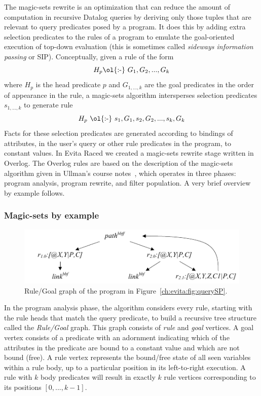 {The magic-sets rewrite is an optimization that can reduce the amount of
computation in recursive Datalog queries by deriving only those tuples that are
relevant to query predicates posed by a program.  It does this by adding extra
selection predicates to the rules of a program to emulate the goal-oriented
execution of top-down evaluation (this is sometimes called \emph{sideways
information passing} or SIP).  Conceptually, given a rule of the form 
\[ H_p \text{\ol{:-}}\ G_1, G_2, ..., G_k \] where $H_p$ is the head predicate $p$ and
$G_{1,...,k}$ are the goal predicates in the order of appearance in the rule, a
magic-sets algorithm intersperses selection predicates $s_{1,...,k}$ to
generate rule \[ H_p \ \text{\ol{:-}}\ s_1, G_1, s_2, G_2, ..., s_{k}, G_k \]
Facts for these selection predicates are generated according to bindings of
attributes, in the user's query or other rule predicates in the program, to
constant values.  In Evita Raced we created a magic-sets rewrite stage written
in Overlog.  The Overlog rules are based on the description of the magic-sets
algorithm given in Ullman's course notes~\cite{ullmanNotes}, which operates in
three phases: program analysis, program rewrite, and filter population.  A very
brief overview by example follows.

\subsubsection{Magic-sets by example}

\begin{figure}[!t]
\begin{center}
\includegraphics[scale=1.8]{figures/RuleGoalGraph}
\caption{Rule/Goal graph of the program in Figure~\ref{ch:evita:fig:querySP}.}
\label{ch:evita:fig:rggraph}
\end{center}
\end{figure}

In the program analysis phase, the algorithm considers every rule,
starting with the rule heads that match the query predicate, to build
a recursive tree structure called the {\em Rule/Goal} graph. This graph consists 
of \emph{rule} and \emph{goal} vertices.  A goal vertex consists of a predicate 
with an adornment indicating which of the attributes in the predicate are bound 
to a constant value and which are not bound (free).  A rule vertex represents the bound/free 
state of all seen variables within a rule body, up to a particular position in its left-to-right 
execution. A rule with $k$ body predicates will result in exactly $k$ rule vertices 
corresponding to its positions $[0,...,k-1]$.

}
